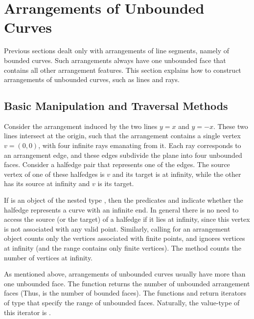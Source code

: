 \section{Arrangements of Unbounded Curves\label{arr_sec:unbounded}}

Previous sections dealt only with arrangements of line segments,
namely of bounded curves. Such arrangements always have one unbounded
face that contains all other arrangement features. This section
explains how to construct arrangements of unbounded curves, such as
lines and rays.

\subsection{Basic Manipulation and Traversal Methods\label{arr_ssec:unb_basic}}

Consider the arrangement induced by the two lines $y = x$ and
$y = -x$. These two lines intersect at the origin, such that the
arrangement contains a single vertex $v = (0,0)$, with four infinite
rays emanating from it. Each ray corresponds to an arrangement edge,
and these edges subdivide the plane into four unbounded faces.
Consider a halfedge pair that represents one of the edges. The source
vertex of one of these halfedges is $v$ and its target is at infinity,
while the other has its source at infinity and $v$ is its target.

If  is an object of the nested type
, then the predicates
 and  indicate
whether the halfedge represents a curve with an infinite end.
In general there is no need to access the source (or the target) of a
halfedge if it lies at infinity, since this vertex is not associated
with any valid point. Similarly, calling 
for an arrangement object  counts only the vertices
associated with finite points, and ignores vertices at infinity
(and the range \ccc{[vertices_begin(), vertices_end())} contains only
finite vertices). The method 
counts the number of vertices at infinity.

As mentioned above, arrangements of unbounded curves usually have more
than one unbounded face. The function 
returns the number of unbounded arrangement faces
(Thus, 
is the number of bounded faces).
The functions  and
 return iterators of type
 that specify the range
of unbounded faces. Naturally, the value-type of this iterator is
.

